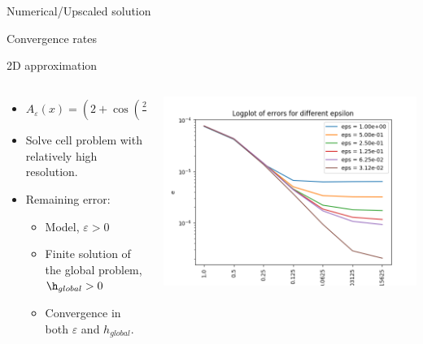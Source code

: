 \documentclass{beamer}
\renewcommand{\epsilon}{\varepsilon}
\begin{document}
\begin{frame}[t]{Numerical/Upscaled solution}

\end{frame}

\begin{frame}[t]{Convergence rates}

\end{frame}

\begin{frame}[t]{2D approximation}
  \begin{columns}
    \begin{column}[c]{.6\textwidth}
      \begin{itemize}
        \item
         $ A_\epsilon(x) =  \left( 2+\cos\left(\frac{2\pi(x+2y)}{\epsilon}\right) \right)^{-1}$
       \item Solve cell problem with relatively high resolution.
       \item Remaining error:
      \begin{itemize}
        \item Model, $\epsilon > 0$
        \item Finite solution of the global problem, $\h_{global} > 0$
        \item Convergence in both  $\epsilon$ and $h_{global}$.
       \end{itemize}
      \end{itemize}
    \end{column}
    \begin{column}[c]{.4\textwidth}
      \includegraphics[width=0.9\linewidth]{2d_global_errors.png}      %
    \end{column}
  \end{columns}

\end{frame}
\end{document}
